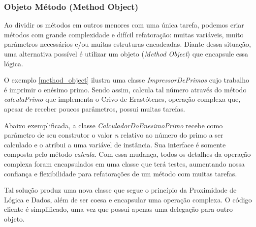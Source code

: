 \subsubsection{Objeto Método (Method Object)}
\label{objeto_metodo}
Ao dividir os métodos em outros menores com uma única tarefa, podemos criar métodos com grande complexidade e difícil refatoração: muitas variáveis, muito parâmetros 
necessários e/ou muitas estruturas encadeadas. Diante dessa situação, uma alternativa possível é utilizar um objeto (\textit{Method Object}) que encapsule essa 
lógica.
	

O exemplo \ref{method_object} ilustra uma classe \textit{ImpressorDePrimos} cujo trabalho é imprimir o enésimo primo. Sendo assim, calcula tal número através
do método \textit{calculaPrimo} que implementa o Crivo de Erastótenes, operação complexa que, apesar de receber poucos parâmetros, possui muitas tarefas.



Abaixo exemplificada, a classe \textit{CalculadorDoEnesimoPrimo} recebe como parâmetro de seu construtor o valor \textit{n} relativo ao número do primo a ser 
calculado e o atribui a uma variável de instância. Sua interface é somente composta pelo método \textit{calcula}. Com essa mudança, todos os detalhes da operação 
complexa foram encapsulados em uma classe que terá testes, aumentando nossa confiança e flexibilidade para refatorações de um método com muitas tarefas.


	
Tal solução produz uma nova classe que segue o princípio da Proximidade de Lógica e Dados, além de ser coesa e encapsular uma operação complexa. O código cliente 
é simplificado, uma vez que possui apenas uma delegação para outro objeto.

